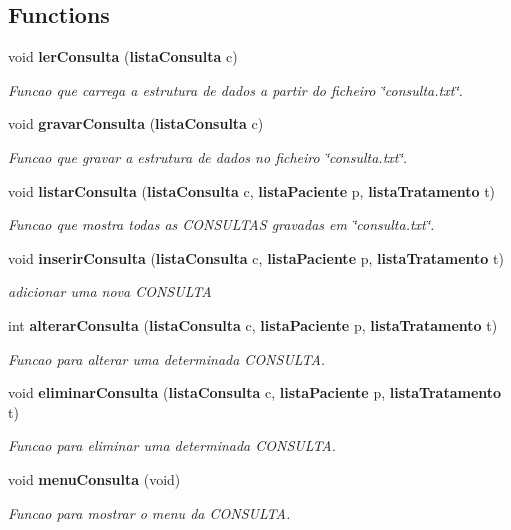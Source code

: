 \subsection*{Functions}
\begin{DoxyCompactItemize}
\item 
void {\bf ler\+Consulta} ({\bf lista\+Consulta} c)
\begin{DoxyCompactList}\small\item\em Funcao que carrega a estrutura de dados a partir do ficheiro \char`\"{}consulta.\+txt\char`\"{}. \end{DoxyCompactList}\item 
void {\bf gravar\+Consulta} ({\bf lista\+Consulta} c)
\begin{DoxyCompactList}\small\item\em Funcao que gravar a estrutura de dados no ficheiro \char`\"{}consulta.\+txt\char`\"{}. \end{DoxyCompactList}\item 
void {\bf listar\+Consulta} ({\bf lista\+Consulta} c, {\bf lista\+Paciente} p, {\bf lista\+Tratamento} t)
\begin{DoxyCompactList}\small\item\em Funcao que mostra todas as C\+O\+N\+S\+U\+L\+T\+A\+S gravadas em \char`\"{}consulta.\+txt\char`\"{}. \end{DoxyCompactList}\item 
void {\bf inserir\+Consulta} ({\bf lista\+Consulta} c, {\bf lista\+Paciente} p, {\bf lista\+Tratamento} t)
\begin{DoxyCompactList}\small\item\em adicionar uma nova C\+O\+N\+S\+U\+L\+T\+A \end{DoxyCompactList}\item 
int {\bf alterar\+Consulta} ({\bf lista\+Consulta} c, {\bf lista\+Paciente} p, {\bf lista\+Tratamento} t)
\begin{DoxyCompactList}\small\item\em Funcao para alterar uma determinada C\+O\+N\+S\+U\+L\+T\+A. \end{DoxyCompactList}\item 
void {\bf eliminar\+Consulta} ({\bf lista\+Consulta} c, {\bf lista\+Paciente} p, {\bf lista\+Tratamento} t)
\begin{DoxyCompactList}\small\item\em Funcao para eliminar uma determinada C\+O\+N\+S\+U\+L\+T\+A. \end{DoxyCompactList}\item 
void {\bf menu\+Consulta} (void)
\begin{DoxyCompactList}\small\item\em Funcao para mostrar o menu da C\+O\+N\+S\+U\+L\+T\+A. \end{DoxyCompactList}\end{DoxyCompactItemize}


